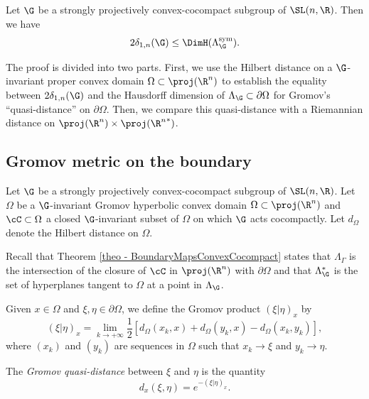 \begin{theorem} \label{th - lower bound}
Let $\G$ be a strongly projectively convex-cocompact subgroup of $\SL(n,\R)$. Then we have
\[ 2\delta_{{1,n}}(\G) \leq \DimH(\Lambda^{\mathrm{sym}}_\G). \]
\end{theorem}

The proof is divided into two parts. First, we use the Hilbert distance on a $\G$\nobreakdash-in\-vari\-ant proper convex domain $\Omega\subset\proj(\R^n)$ to establish the equality between $2\delta_{1,n}(\G)$ and the Hausdorff dimension of $\Lambda_\G\subset \partial\Omega$ for Gromov's ``quasi-distance'' on $\partial \Omega$. Then, we compare this quasi-distance with a Riemannian distance on $\proj(\R^n)\times\proj({\R^n}^*)$.

\subsection{Gromov metric on the boundary}\label{subsec-gromov metric on the boundary}
Let $\G$ be a strongly projectively convex-cocompact subgroup of $\SL(n,\R)$. Let $\Omega$ be a $\G$-invariant Gromov hyperbolic convex domain $\Omega\subset\proj(\R^n)$ and $\cC\subset \Omega$ a closed $\G$-invariant subset of $\Omega$ on which $\G$ acts cocompactly. Let $d_\Omega$ denote the Hilbert distance on $\Omega$.

Recall that Theorem \ref{theo - BoundaryMapsConvexCocompact} states that $\Lambda_\Gamma$ is the intersection of the closure of $\cC$ in $\proj(\R^n)$ with $\partial \Omega$ and that $\Lambda_\G^*$ is the set of hyperplanes tangent to $\Omega$ at a point in $\Lambda_\G$.

Given $x\in \Omega$ and $\xi,\eta\in \partial\Omega$, we define the Gromov product $(\xi\vert\eta)_x$ by
\[( \xi \vert \eta)_x = \lim_{k\to +\infty} \frac{1}{2}[ d_\Omega(x_k, x) +d_\Omega(y_k, x) -d_\Omega(x_k, y_k)],\]
where $(x_k)$ and $(y_k)$ are sequences in $\Omega$ such that $x_k \to \xi $ and $y_k\to \eta$.

\begin{defi} \label{def - gromov distance}
The \emph{Gromov quasi-distance} between $\xi$ and $\eta$ is the quantity
\[d_x(\xi, \eta)= e^{-( \xi\vert \eta)_x }.\]
\end{defi}

